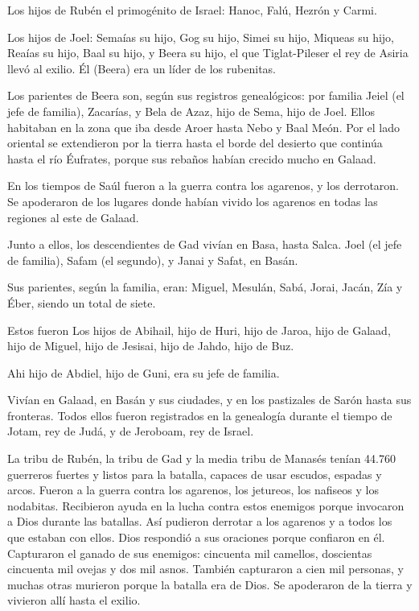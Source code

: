  Los hijos de Rubén el primogénito de Israel: Hanoc, Falú,
Hezrón y Carmi.

 Los hijos de Joel: Semaías su hijo, Gog su hijo, Simei su
hijo,  Miqueas su hijo, Reaías su hijo, Baal su hijo,
 y Beera su hijo, el que Tiglat-Pileser el rey de Asiria
llevó al exilio. Él (Beera) era un líder de los rubenitas.

 Los parientes de Beera son, según sus registros
genealógicos: por familia Jeiel (el jefe de familia), Zacarías,
 y Bela de Azaz, hijo de Sema, hijo de Joel. Ellos habitaban
en la zona que iba desde Aroer hasta Nebo y Baal Meón.  Por
el lado oriental se extendieron por la tierra hasta el borde del
desierto que continúa hasta el río Éufrates, porque sus rebaños habían
crecido mucho en Galaad.

 En los tiempos de Saúl fueron a la guerra contra los
agarenos, y los derrotaron. Se apoderaron de los lugares donde habían
vivido los agarenos en todas las regiones al este de Galaad.

 Junto a ellos, los descendientes de Gad vivían en Basa,
hasta Salca.  Joel (el jefe de familia), Safam (el
segundo), y Janai y Safat, en Basán.

 Sus parientes, según la familia, eran: Miguel, Mesulán,
Sabá, Jorai, Jacán, Zía y Éber, siendo un total de siete.

 Estos fueron Los hijos de Abihail, hijo de Huri, hijo de
Jaroa, hijo de Galaad, hijo de Miguel, hijo de Jesisai, hijo de Jahdo,
hijo de Buz.

 Ahi hijo de Abdiel, hijo de Guni, era su jefe de familia.

 Vivían en Galaad, en Basán y sus ciudades, y en los
pastizales de Sarón hasta sus fronteras.  Todos ellos
fueron registrados en la genealogía durante el tiempo de Jotam, rey de
Judá, y de Jeroboam, rey de Israel.

 La tribu de Rubén, la tribu de Gad y la media tribu de
Manasés tenían 44.760 guerreros fuertes y listos para la batalla,
capaces de usar escudos, espadas y arcos.  Fueron a la
guerra contra los agarenos, los jetureos, los nafiseos y los nodabitas.
 Recibieron ayuda en la lucha contra estos enemigos porque
invocaron a Dios durante las batallas. Así pudieron derrotar a los
agarenos y a todos los que estaban con ellos. Dios respondió a sus
oraciones porque confiaron en él.  Capturaron el ganado de
sus enemigos: cincuenta mil camellos, doscientas cincuenta mil ovejas y
dos mil asnos. También capturaron a cien mil personas,  y
muchas otras murieron porque la batalla era de Dios. Se apoderaron de la
tierra y vivieron allí hasta el exilio.


